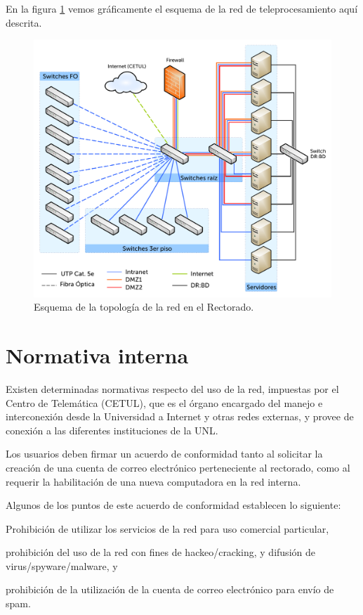 \documentclass[a4paper,11pt,oneside]{article}
\begin{document}
En la figura \ref{topologia} vemos gráficamente el esquema de la red
de teleprocesamiento aquí descrita.
%
\begin{figure}[h]
  \center\includegraphics[width=\textwidth]{img/red}
  \caption{Esquema de la topología de la red en el Rectorado.}
  \label{topologia}
\end{figure}
%
\newpage
\section{Normativa interna}
%
Existen determinadas normativas respecto del uso de la red, impuestas
por el Centro de Telemática (CETUL), que es el órgano encargado del
manejo e interconexión desde la Universidad a Internet y otras redes
externas, y provee de conexión a las diferentes instituciones de la
UNL.

Los usuarios deben firmar un acuerdo de conformidad tanto al solicitar
la creación de una cuenta de correo electrónico perteneciente al
rectorado, como al requerir la habilitación de una nueva computadora
en la red interna.

Algunos de los puntos de este acuerdo de conformidad establecen lo
siguiente:
%
\begin{itemize*}
\item Prohibición de utilizar los servicios de la red para uso
  comercial particular,
\item prohibición del uso de la red con fines de hackeo/cracking, y
  difusión de virus/spy\-ware/malware, y
\item prohibición de la utilización de la cuenta de correo electrónico
  para envío de spam.
\end{itemize*}
%
\end{document}
